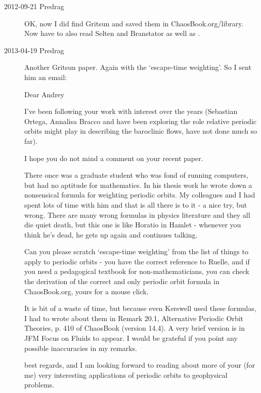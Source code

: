 \begin{description}
\item[2012-09-21 Predrag]
OK, now I did find Gritsun
and saved them in ChaosBook.org/library.
Now have to also read Selten and Branstator
as well as .

\item[2013-04-19  Predrag] Another Gritsun paper. Again
with the `escape-time weighting'. So I sent him an email:

Dear Andrey

    I've been following your work with interest over the years
    (Sebastian  Ortega, Annalisa Bracco and have been exploring the
    role relative periodic orbits might play in describing the
    baroclinic flows, have not done much so far).

    I hope you do not mind a comment on your recent paper.

    There once was a graduate student who was fond of running
    computers, but had no aptitude for mathematics. In his thesis
    work he wrote down a nonsensical formula for weighting periodic
    orbits.  My colleagues and I had spent lots of time with him and
    that is all there is to it - a nice try, but wrong. There are
    many wrong formulas in physics literature and they all die quiet
    death, but this one is like Horatio in Hamlet - whenever you
    think he's dead, he gets up again and continues talking.

    Can you please scratch  `escape-time weighting'  from the list of
    things to apply to periodic orbits - you have the correct
    reference to Ruelle, and if you need a pedagogical textbook for
    non-mathematicians, you can check the derivation of the correct
    and only periodic orbit formula in ChaosBook.org, yours for a
    mouse click.

    It is bit of a waste of time, but because even Kerswell used
    these formulas, I had to wrote about them in Remark 20.1,
    Alternative Periodic Orbit Theories, p. 410 of ChaosBook (version
    14.4). A very brief version is in JFM Focus on Fluids to
    appear. I would be grateful if you point any possible
    inaccuracies in my remarks.

best regards, and I am looking forward to reading about more of your
(for me) very interesting applications of periodic orbits to
geophysical problems.




\end{description}
